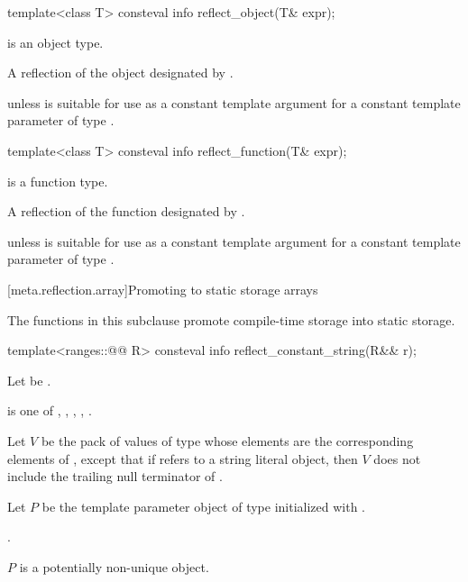 %
\begin{itemdecl}
template<class T>
  consteval info reflect_object(T& expr);
\end{itemdecl}

\begin{itemdescr}
\pnum
\mandates
{} is an object type.

\pnum
\returns
A reflection of the object designated by .

\pnum
\throws
{} unless
 is suitable for use as a constant template argument
for a constant template parameter of type .
\end{itemdescr}

%
\begin{itemdecl}
template<class T>
  consteval info reflect_function(T& expr);
\end{itemdecl}

\begin{itemdescr}
\pnum
\mandates
{} is a function type.

\pnum
\returns
A reflection of the function designated by .

\pnum
\throws
{} unless
 is suitable for use as a constant template argument
for a constant template parameter of type .
\end{itemdescr}

[meta.reflection.array]{Promoting to static storage arrays}

\pnum
The functions in this subclause promote compile-time storage into static storage.

%
\begin{itemdecl}
template<ranges::@@ R>
  consteval info reflect_constant_string(R&& r);
\end{itemdecl}

\begin{itemdescr}
\pnum
Let  be .

\pnum
\mandates
{} is one of
,
,
,
,
.

\pnum
Let $V$ be the pack of values of type 
whose elements are the corresponding elements of ,
except that if  refers to a string literal object,
then $V$ does not include the trailing null terminator of .

\pnum
Let $P$ be the template parameter object
of type 
initialized with .

\pnum
\returns
{}.

\pnum
\begin{note}
$P$ is a potentially non-unique object.
\end{note}
\end{itemdescr}


